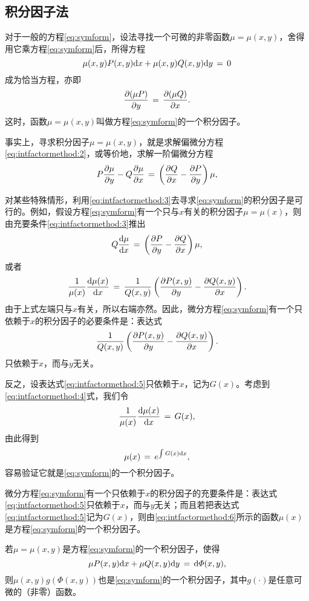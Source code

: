 \subsection{积分因子法}
对于一般的方程\eqref{eq:symform}，设法寻找一个可微的非零函数$\mu=\mu(x,y)$，舍得用它乘方程\eqref{eq:symform}后，所得方程
\begin{equation}\label{eq:intfactormethod:1}
\mu(x,y)P(x,y)\mathrm{d} x+\mu(x,y)Q(x,y)\mathrm{d} y\,=\,0
\end{equation}
成为恰当方程，亦即
\begin{equation}\label{eq:intfactormethod:2}
\frac{\partial{}(\mu P)}{\partial{}y}\,=\,\frac{\partial{}(\mu Q)}{\partial{}x}.
\end{equation}
这时，函数$\mu=\mu(x,y)$叫做方程\eqref{eq:symform}的一个{\heiti 积分因子}。\par
事实上，寻求积分因子$\mu=\mu(x,y)$，就是求解偏微分方程\eqref{eq:intfactormethod:2}，或等价地，求解一阶偏微分方程
\begin{equation}\label{eq:intfactormethod:3}
P\frac{\partial{}\mu}{\partial{}y}-Q\frac{\partial{}\mu}{\partial{}x}\,=\,\left(\frac{\partial{}Q}{\partial{}x}-\frac{\partial{}P}{\partial{}y}\right)\mu,
\end{equation}\par
对某些特殊情形，利用\eqref{eq:intfactormethod:3}去寻求\eqref{eq:symform}的积分因子是可行的。例如，假设方程\eqref{eq:symform}有一个只与$x$有关的积分因子$\mu=\mu(x)$，则由充要条件\eqref{eq:intfactormethod:3}推出
$$Q\frac{\mathrm{d}{}\mu}{\mathrm{d}{}x}\,=\,\left(\frac{\partial{}P}{\partial{}y}-\frac{\partial{}Q}{\partial{}x}\right)\mu,$$
或者
\begin{equation}\label{eq:intfactormethod:4}
\frac{1}{\mu(x)}\frac{\mathrm{d}{}\mu(x)}{\mathrm{d}{}x}\,=\,\frac{1}{Q(x,y)}\left(\frac{\partial{}P(x,y)}{\partial{}y}-\frac{\partial{}Q(x,y)}{\partial{}x}\right).
\end{equation}
由于上式左端只与$x$有关，所以右端亦然。因此，微分方程\eqref{eq:symform}有一个只依赖于$x$的积分因子的必要条件是：表达式
\begin{equation}\label{eq:intfactormethod:5}
\frac{1}{Q(x,y)}\left(\frac{\partial{}P(x,y)}{\partial{}y}-\frac{\partial{}Q(x,y)}{\partial{}x}\right).
\end{equation}
只依赖于$x$，而与$y$无关。\par
反之，设表达式\eqref{eq:intfactormethod:5}只依赖于$x$，记为$G(x)$。考虑到\eqref{eq:intfactormethod:4}式，我们令
$$\frac{1}{\mu(x)}\frac{\mathrm{d}{}\mu(x)}{\mathrm{d}{}x}\,=\,G(x),$$
由此得到
\begin{equation}\label{eq:intfactormethod:6}
\mu(x)\,=\,e^{\int G(x)\mathrm{d} x},
\end{equation}
容易验证它就是\eqref{eq:symform}的一个积分因子。
\begin{theo}\label{theo:intfactormethod:1}
微分方程\eqref{eq:symform}有一个只依赖于$x$的积分因子的充要条件是：表达式\eqref{eq:intfactormethod:5}只依赖于$x$，而与$y$无关；而且若把表达式\eqref{eq:intfactormethod:5}记为$G(x)$，则由\eqref{eq:intfactormethod:6}所示的函数$\mu(x)$是方程\eqref{eq:symform}的一个积分因子。
\end{theo}
\begin{theo}\label{theo:intfactormethod:2}
若$\mu=\mu(x,y)$是方程\eqref{eq:symform}的一个积分因子，使得
$$\mu P(x,y)\mathrm{d} x+\mu Q(x,y)\mathrm{d} y\,=\,\mathrm{d}\varPhi(x,y),$$
则$\mu(x,y)g(\varPhi(x,y))$也是\eqref{eq:symform}的一个积分因子，其中$g(\cdot)$是任意可微的（非零）函数。
\end{theo}


